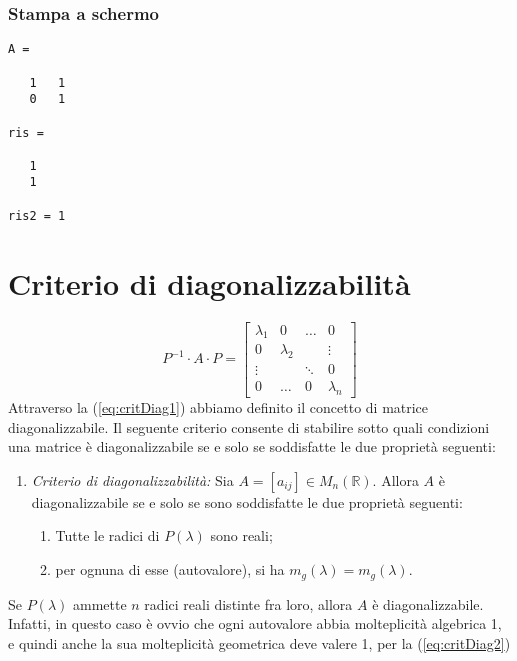 

\subsubsection{Stampa a schermo}
\label{sec:stauto}

\begin{verbatim}
A =

   1   1
   0   1

ris =

   1
   1

ris2 = 1
\end{verbatim}

\section{Criterio di diagonalizzabilità}
\label{sec:diagonalizzabilità}
\begin{equation}
  \label{eq:critDiag1}
  P^{-1}\cdot A \cdot P=
  \begin{bmatrix}
    \lambda_1 & 0 & \dots & 0\\
    0 & \lambda_2 && \vdots\\
    \vdots && \ddots & 0\\
    0 & \dots & 0 & \lambda_n
  \end{bmatrix}
\end{equation}
Attraverso la (\ref{eq:critDiag1}) abbiamo definito il concetto di matrice diagonalizzabile. Il seguente criterio
consente di stabilire sotto quali condizioni una matrice è diagonalizzabile se e solo se soddisfatte le due
proprietà seguenti:
\begin{enumerate}
\item \textit{Criterio di diagonalizzabilità:} Sia $A=[a_{ij}]\in M_n(\mathds{R})$. Allora $A$ è diagonalizzabile
  se e solo se sono soddisfatte le due proprietà seguenti:
  \begin{enumerate}
  \item Tutte le radici di $P(\lambda)$ sono reali;
  \item per ognuna di esse (autovalore), si ha $m_g(\lambda)=m_g(\lambda)$.
  \end{enumerate}
\end{enumerate}
\begin{oss}
  Se $P(\lambda)$ ammette $n$ radici reali distinte fra loro, allora $A$ è diagonalizzabile. Infatti, in questo
  caso è ovvio che ogni autovalore abbia molteplicità algebrica 1, e quindi anche la sua molteplicità geometrica
  deve valere 1, per la (\ref{eq:critDiag2})
\end{oss}
